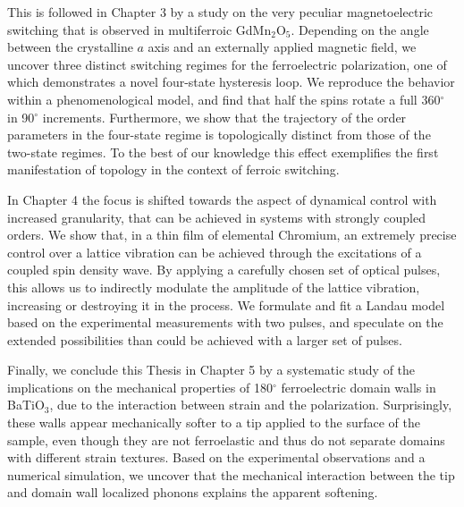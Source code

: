 \documentclass[10pt, a4paper]{article}
\begin{document}
This is followed in Chapter 3 by a study on the very peculiar magnetoelectric switching that is observed in multiferroic GdMn$_2$O$_5$.
Depending on the angle between the crystalline $a$ axis and an externally applied magnetic field, we uncover three distinct switching regimes for the ferroelectric polarization, one of which demonstrates a novel four-state hysteresis loop.
We reproduce the behavior within a phenomenological model, and find that half the spins rotate a full 360$^\circ$ in 90$^\circ$ increments.
Furthermore, we show that the trajectory of the order parameters in the four-state regime is topologically distinct from those of the two-state regimes. To the best of our knowledge this effect exemplifies the first manifestation of topology in the context of ferroic switching.

In Chapter 4 the focus is shifted towards the aspect of dynamical control with increased granularity, that can be achieved in systems with strongly coupled orders.
We show that, in a thin film of elemental Chromium, an extremely precise control over a lattice vibration can be achieved through the excitations of a coupled spin density wave.
By applying a carefully chosen set of optical pulses, this allows us to indirectly modulate the amplitude of the lattice vibration, increasing or destroying it in the process.
We formulate and fit a Landau model based on the experimental measurements with two pulses, and speculate on the extended possibilities than could be achieved with a larger set of pulses. 

Finally, we conclude this Thesis in Chapter 5 by a systematic study of the implications on the mechanical properties of 180$^\circ$ ferroelectric domain walls in BaTiO$_3$, due to the interaction between strain and the polarization.
Surprisingly, these walls appear mechanically softer to a tip applied to the surface of the sample, even though they are not ferroelastic and thus do not separate domains with different strain textures.
Based on the experimental observations and a numerical simulation, we uncover that the mechanical interaction between the tip and domain wall localized phonons explains the apparent softening.
\end{document}
